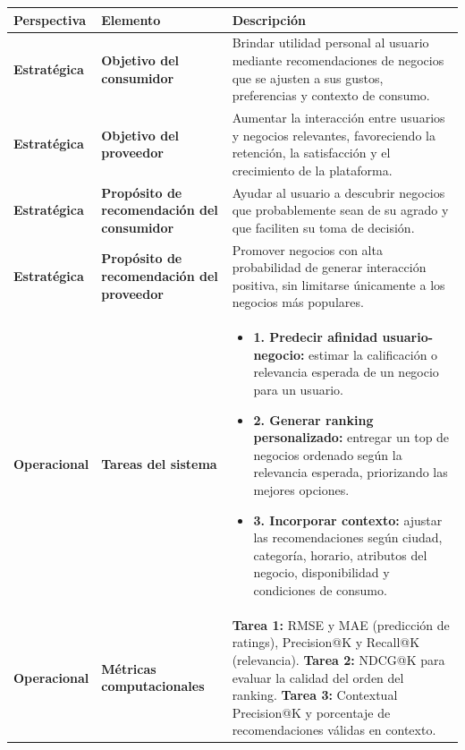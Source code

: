 \documentclass[11pt,a4paper]{article}
\begin{document}
\begin{small}
\begin{longtable}{|p{2cm}|>{\raggedright\arraybackslash}p{3.5cm}|p{9cm}|}
\hline
\rowcolor[gray]{0.9} \textbf{Perspectiva} & \textbf{Elemento} & \textbf{Descripción} \\ \hline
\endhead

\textbf{Estratégica} & \textbf{Objetivo del consumidor} & Brindar utilidad personal al usuario mediante recomendaciones de negocios que se ajusten a sus gustos, preferencias y contexto de consumo. \\ \hline

\textbf{Estratégica} & \textbf{Objetivo del proveedor} & Aumentar la interacción entre usuarios y negocios relevantes, favoreciendo la retención, la satisfacción y el crecimiento de la plataforma. \\ \hline

\textbf{Estratégica} & \textbf{Propósito de recomendación del consumidor} & Ayudar al usuario a descubrir negocios que probablemente sean de su agrado y que faciliten su toma de decisión. \\ \hline

\textbf{Estratégica} & \textbf{Propósito de recomendación del proveedor} & Promover negocios con alta probabilidad de generar interacción positiva, sin limitarse únicamente a los negocios más populares. \\ \hline

\textbf{Operacional} & \textbf{Tareas del sistema} & 
\begin{itemize}[leftmargin=*, nosep]
    \item \textbf{1. Predecir afinidad usuario-negocio:} estimar la calificación o relevancia esperada de un negocio para un usuario.
    \item \textbf{2. Generar ranking personalizado:} entregar un top de negocios ordenado según la relevancia esperada, priorizando las mejores opciones.
    \item \textbf{3. Incorporar contexto:} ajustar las recomendaciones según ciudad, categoría, horario, atributos del negocio, disponibilidad y condiciones de consumo.
\end{itemize} \\ \hline

\textbf{Operacional} & \textbf{Métricas computacionales} & 
\textbf{Tarea 1:} RMSE y MAE (predicción de ratings), Precision@K y Recall@K (relevancia). \newline
\textbf{Tarea 2:} NDCG@K para evaluar la calidad del orden del ranking. \newline
\textbf{Tarea 3:} Contextual Precision@K y porcentaje de recomendaciones válidas en contexto. \\ \hline
\end{longtable}
\end{small}
\end{document}
